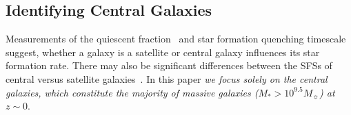 \documentclass[tighten, preprint]{aastex62}
\begin{document}
\subsection{Identifying Central Galaxies} \label{sec:central}
Measurements of the quiescent fraction~\citep[\emph{e.g.}][]{baldry2006,peng2010,hahn2015}
and star formation quenching timescale~\citep{wetzel2013,hahn2017} 
suggest, whether a galaxy is a satellite or central galaxy influences 
its star formation rate. There may also be significant differences 
between the SFSs of central versus satellite galaxies~\citep{wang2018}. 
In this paper \emph{we focus solely on the central galaxies, which 
constitute the majority of massive galaxies ($M_* > 10^{9.5}M_\sun$) at $z \sim 0$}. 
\end{document}
